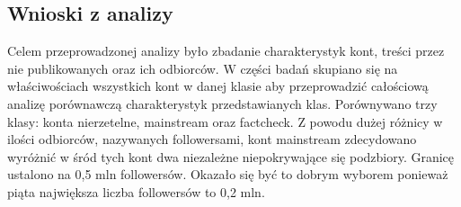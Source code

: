 \subsection{Wnioski z analizy}
Celem przeprowadzonej analizy było zbadanie charakterystyk kont, treści przez nie publikowanych oraz ich odbiorców. W części badań skupiano się na właściwościach wszystkich kont w danej klasie aby przeprowadzić całościową analizę porównawczą charakterystyk przedstawianych klas. Porównywano trzy klasy: konta nierzetelne, mainstream oraz factcheck. Z powodu dużej różnicy w ilości odbiorców, nazywanych followersami, kont mainstream zdecydowano wyróżnić w śród tych kont dwa niezależne niepokrywające się podzbiory. Granicę ustalono na 0,5 mln followersów. Okazało się być to dobrym wyborem ponieważ piąta największa liczba followersów to 0,2 mln.  